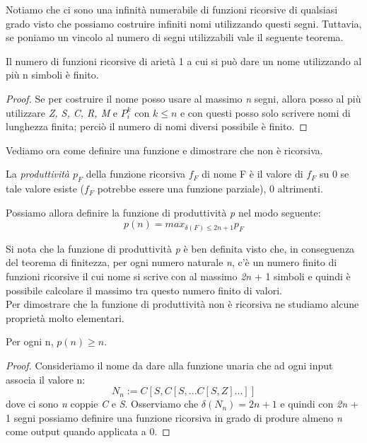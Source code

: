 Notiamo che ci sono una infinità numerabile di funzioni ricorsive di qualsiasi grado visto che possiamo costruire infiniti nomi utilizzando questi segni. Tuttavia, se poniamo un vincolo al numero di segni utilizzabili vale il seguente teorema. 

\begin{thm}[Finitezza]
 Il numero di funzioni ricorsive di arietà 1 a cui si può dare un nome utilizzando al più n simboli è finito.
\end{thm}

\begin{proof}
Se per costruire il nome posso usare al massimo \emph{n} segni, allora posso al più utilizzare \emph{Z, S, C, R, M} e $P^k_i$ con \emph{$k \leq n$} e con questi posso solo scrivere nomi di lunghezza finita; perciò il numero di nomi diversi possibile è finito.
 \end{proof}

Vediamo ora come definire una funzione e dimostrare che non è ricorsiva.

\begin{defi}
La \emph{produttività $p_F$} della funzione ricorsiva $f_F$ di nome F è il valore di $f_F$ su 0 se tale valore esiste ($f_F$ potrebbe essere una funzione parziale), 0 altrimenti.
\end{defi}

Possiamo allora definire la funzione di produttività \emph{p} nel modo seguente: $$p(n)=max_{\delta(F)\leq 2n + 1} p_F$$

Si nota che la funzione di produttività \emph{p} è ben definita visto che, in conseguenza del teorema di finitezza, per ogni numero naturale \emph{n}, c'è un numero finito di funzioni ricorsive il cui nome si scrive con al massimo \emph{2n} + 1 simboli e quindi è possibile calcolare il massimo tra questo numero finito di valori.\\
Per dimostrare che la funzione di produttività non è ricorsiva ne studiamo alcune proprietà molto elementari.

\begin{prop}Per ogni n, $p(n) \geq n$.
\end{prop}
\begin{proof} 
Consideriamo il nome da dare alla funzione unaria che ad ogni input associa il valore n:
$$N_n := C[S, C[S,...C[S, Z]...]]$$
dove ci sono \emph{n} coppie \emph{C} e \emph{S}. 
Osserviamo che $\delta(N_n) = 2n + 1$ e quindi con \emph{2n} + 1 segni possiamo definire una funzione ricorsiva in grado di produre almeno \emph{n} come output quando applicata a 0.
\end{proof}

